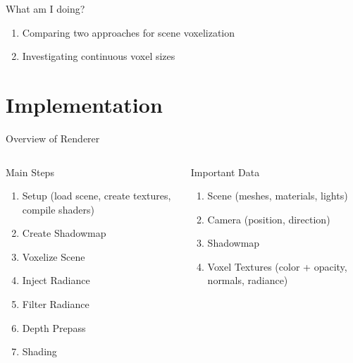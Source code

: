 \documentclass[10pt]{beamer}
\begin{document}

\begin{frame}{What am I doing?} %
  \begin{enumerate}
    \item Comparing two approaches for scene voxelization %
    \item Investigating continuous voxel sizes %
  \end{enumerate}
\end{frame}

\section{Implementation}

\begin{frame}{Overview of Renderer}

  \begin{columns}
    \begin{column}{0.5\textwidth}
      \begin{block}{Main Steps}
        \begin{enumerate}
          \item Setup (load scene, create textures, compile shaders)
          \item Create Shadowmap
          \item Voxelize Scene
          \item Inject Radiance
          \item Filter Radiance
          \item Depth Prepass
          \item Shading
        \end{enumerate}
      \end{block}
    \end{column}
    \begin{column}{0.5\textwidth}
      \begin{block}{Important Data}
        \begin{enumerate}
          \item Scene (meshes, materials, lights)
          \item Camera (position, direction) %
          \item Shadowmap %
          \item Voxel Textures (color + opacity, normals, radiance)
        \end{enumerate}
      \end{block}
    \end{column}
  \end{columns}
\end{frame}
\end{document}
